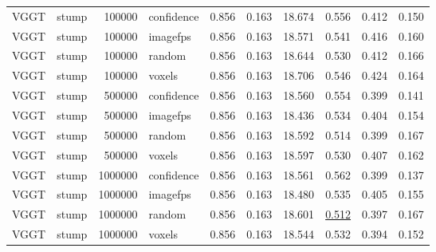\begin{table}[H]
\begin{tabular}{llrlrrrrrr}
VGGT & stump & 100000 & confidence & 0.856 & 0.163 & 18.674 & 0.556 & 0.412 & 0.150 \\
VGGT & stump & 100000 & imagefps & 0.856 & 0.163 & 18.571 & 0.541 & 0.416 & 0.160 \\
VGGT & stump & 100000 & random & 0.856 & 0.163 & 18.644 & 0.530 & 0.412 & 0.166 \\
VGGT & stump & 100000 & voxels & 0.856 & 0.163 & 18.706 & 0.546 & 0.424 & 0.164 \\
VGGT & stump & 500000 & confidence & 0.856 & 0.163 & 18.560 & 0.554 & 0.399 & 0.141 \\
VGGT & stump & 500000 & imagefps & 0.856 & 0.163 & 18.436 & 0.534 & 0.404 & 0.154 \\
VGGT & stump & 500000 & random & 0.856 & 0.163 & 18.592 & 0.514 & 0.399 & 0.167 \\
VGGT & stump & 500000 & voxels & 0.856 & 0.163 & 18.597 & 0.530 & 0.407 & 0.162 \\
VGGT & stump & 1000000 & confidence & 0.856 & 0.163 & 18.561 & 0.562 & 0.399 & 0.137 \\
VGGT & stump & 1000000 & imagefps & 0.856 & 0.163 & 18.480 & 0.535 & 0.405 & 0.155 \\
VGGT & stump & 1000000 & random & 0.856 & 0.163 & 18.601 & \underline{0.512} & 0.397 & 0.167 \\
VGGT & stump & 1000000 & voxels & 0.856 & 0.163 & 18.544 & 0.532 & 0.394 & 0.152 \\
\bottomrule
\end{tabular}
\end{table}